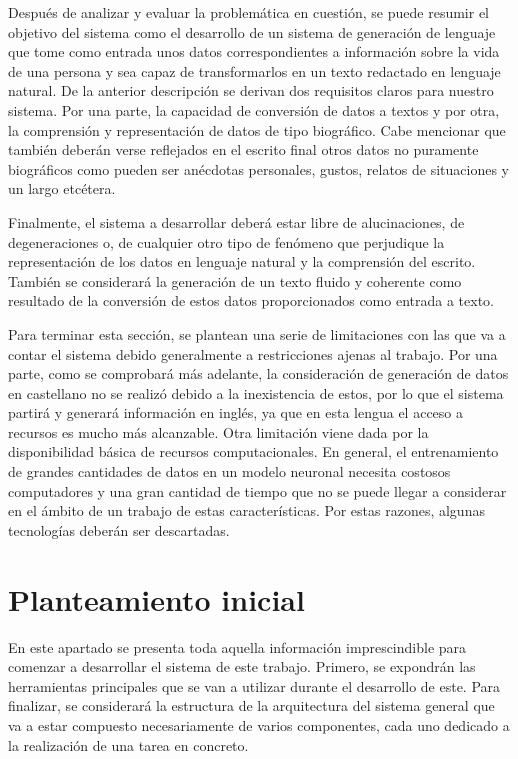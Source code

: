 Después de analizar y evaluar la problemática en cuestión, se puede resumir el objetivo del sistema como el desarrollo de un sistema de generación de lenguaje que tome como entrada unos datos correspondientes a información sobre la vida de una persona y sea capaz de transformarlos en un texto redactado en lenguaje natural. De la anterior descripción se derivan dos requisitos claros para nuestro sistema. Por una parte, la capacidad de conversión de datos a textos y por otra, la comprensión y representación de datos de tipo biográfico. Cabe mencionar que también deberán verse reflejados en el escrito final otros datos no puramente biográficos como pueden ser anécdotas personales, gustos, relatos de situaciones y un largo etcétera.

Finalmente, el sistema a desarrollar deberá estar libre de alucinaciones, de degeneraciones o, de cualquier otro tipo de fenómeno que perjudique la representación de los datos en lenguaje natural y la comprensión del escrito. También se considerará la generación de un texto fluido y coherente como resultado de la conversión de estos datos proporcionados como entrada a texto.

Para terminar esta sección, se plantean una serie de limitaciones con las que va a contar el sistema debido generalmente a restricciones ajenas al trabajo. Por una parte, como se comprobará más adelante, la consideración de generación de datos en castellano no se realizó debido a la inexistencia de estos, por lo que el sistema partirá y generará información en inglés, ya que en esta lengua el acceso a recursos es mucho más alcanzable. Otra limitación viene dada por la disponibilidad básica de recursos computacionales. En general, el entrenamiento de grandes cantidades de datos en un modelo neuronal necesita costosos computadores y una gran cantidad de tiempo que no se puede llegar a considerar en el ámbito de un trabajo de estas características. Por estas razones, algunas tecnologías deberán ser descartadas.



\section{Planteamiento inicial}
\label{sec:PlanteamientoInicial}

En este apartado se presenta toda aquella información imprescindible para comenzar a desarrollar el sistema de este trabajo. Primero, se expondrán las herramientas principales que se van a utilizar durante el desarrollo de este. Para finalizar, se considerará la estructura de la arquitectura del sistema general que va a estar compuesto necesariamente de varios componentes, cada uno dedicado a la realización de una tarea en concreto.



